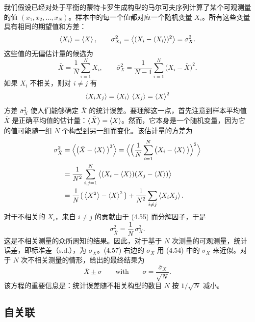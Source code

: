 我们假设已经对处于平衡的蒙特卡罗生成构型的马尔可夫序列计算了某个可观测量的值 $(x_1, x_2, \ldots, x_N)$。样本中的每一个值都对应一个随机变量 $X_i$。所有这些变量具有相同的期望值和方差：
\begin{equation}
  \left\langle X_i \right\rangle = \left\langle X \right\rangle, \qquad
  \sigma_{X_i}^2 = \big\langle (X_i - \left\langle X_i \right\rangle)^2\big\rangle = \sigma_X^2 .
\end{equation}
这些值的无偏估计量的候选为
\begin{equation}
  \bar{X} = \frac{1}{N}\sum_{i=1}^{N} X_i, \qquad
  \bar{\sigma}_X^2 = \frac{1}{N-1}\sum_{i=1}^{N}\big(X_i - \bar{X}\big)^2 .
\end{equation}
如果 $X_i$ 不相关，则对 $i \neq j$ 有
\begin{equation}
  \left\langle X_i X_j \right\rangle = \left\langle X_i \right\rangle\,\left\langle X_j \right\rangle = \left\langle X \right\rangle^2
\end{equation}
方差 $\bar{\sigma}_X^2$ 使人们能够确定 $\bar{X}$ 的统计误差。要理解这一点，首先注意到样本平均值 $\bar{X}$ 是正确平均值的估计量：$\left\langle \bar{X} \right\rangle = \left\langle X \right\rangle$。然而，它本身是一个随机变量，因为它的值可能随一组 $N$ 个构型到另一组而变化。该估计量的方差为
\begin{equation}
  \begin{split}
    \sigma_{\bar{X}}^2 &= \Big\langle\big(\bar{X} - \left\langle X \right\rangle\big)^2\Big\rangle
    = \Big\langle\Big(\frac{1}{N}\sum_{i=1}^{N}\big(X_i - \left\langle X \right\rangle\big)\Big)^2\Big\rangle \\
    &= \frac{1}{N^2}\sum_{i,j=1}^{N}\big\langle (X_i - \left\langle X \right\rangle)(X_j - \left\langle X \right\rangle)\big\rangle \\
    &= \frac{1}{N}\big(\left\langle X^2 \right\rangle - \left\langle X \right\rangle^2\big) + \frac{1}{N^2}\sum_{i\neq j}\left\langle X_i X_j \right\rangle.
  \end{split}
\end{equation}
对于不相关的 $X_i$，来自 $i \neq j$ 的贡献由于 (4.55) 而分解因子，于是
\begin{equation}
  \sigma_{\bar{X}}^2 = \frac{1}{N}\,\sigma_X^2 .
\end{equation}
这是不相关测量的众所周知的结果。因此，对于基于 $N$ 次测量的可观测量，统计误差，即标准差（s.d.），为 $\sigma_{\bar{X}}$。(4.57) 右边的 $\sigma_X$ 用 (4.54) 中的 $\bar{\sigma}_X$ 来近似。对于 $N$ 次不相关测量的情形，给出的最终结果为
\begin{equation}
  \bar{X} \pm \sigma \qquad \text{with}\qquad \sigma = \frac{\bar{\sigma}_X}{\sqrt{N}} .
\end{equation}
该方程的重要信息是：统计误差随不相关构型的数目 $N$ 按 $1/\sqrt{N}$ 减小。

\subsection{自关联}

